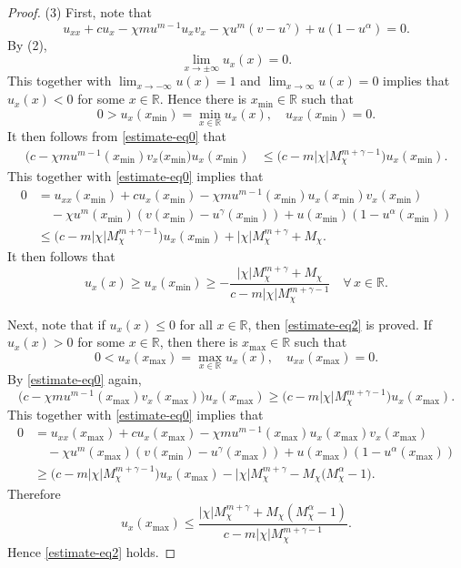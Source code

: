 \documentclass[11pt]{article} %
\theoremstyle{remark}
\theoremstyle{remark}
\numberwithin{equation}{section}
\numberwithin{figure}{section}
\numberwithin{table}{section}
\newcommand\RR{\ensuremath{\mathbb{R}}}
\begin{document}
\begin{proof}
(3) First, note that
$$
u_{xx}+cu_x-\chi m u^{m-1} u_x v_x-\chi u^m (v-u^\gamma)+u(1-u^\alpha)=0.
$$
By (2), 
$$
\lim_{x\to\pm\infty}u_x(x)=0.
$$
This together with $\lim_{x\to -\infty} u(x)=1$ and $\lim_{x\to\infty}u(x)=0$ implies that 
$u_x(x)<0$ for some $x\in\RR$. Hence 
 there is $x_{\min}\in\RR$ such that
$$
0>u_x(x_{\min})=\min_{x\in\RR} u_x(x),\quad u_{xx}(x_{\min})=0.
$$
It then follows from   \eqref{estimate-eq0}
that
\begin{align*}
\big(c -\chi m u^{m-1}(x_{\min}) v_x(x_{\min}\big)u_x(x_{\min}) &\le \Big (c- {m |\chi| M_\chi^{m+\gamma-1}} \Big) u_x(x_{\min}).
\end{align*}
This together with \eqref{estimate-eq0}  implies that
\begin{align*}
0&=u_{xx}(x_{\min})+cu_x(x_{\min})-\chi m u^{m-1}(x_{\min}) u_x (x_{\min})v_x(x_{\min})\\
&\quad -\chi u^m(x_{\min}) (v(x_{\min})-u^\gamma(x_{\min})) +u(x_{\min})(1-u^\alpha(x_{\min}))\\
&\le \big(c- m|\chi| M^{m+\gamma -1}_{\chi}\big)u_x(x_{\min})+ |\chi| M_{\chi}^{m+\gamma}+M_{\chi}.
\end{align*}
It then follows that
$$
u_x(x)\ge u_x(x_{\min})\ge -\frac{|\chi| M_{\chi}^{m+\gamma}+M_{\chi}}{c-m|\chi| M^{m+\gamma-1} _{\chi} }   \quad \forall\, x\in\RR.
$$

Next, note that if $u_x(x)\le 0$ for all $x\in\RR$, then \eqref{estimate-eq2} is proved. If $u_x(x)>0$ for some $x\in\RR$, then there is $x_{\max}\in\RR$ such that
$$
0<u_{x}(x_{\max})=\max_{x\in\RR} u_x(x),\quad u_{xx}(x_{\max})=0.
$$
By \eqref{estimate-eq0} again,
$$
\big(c-\chi m u^{m-1}(x_{\max}) v_x(x_{\max})\big)u_x(x_{\max})\ge \Big (c- m |\chi| M^{m+\gamma-1}_\chi \Big)u_x(x_{\max}).
$$
This together with \eqref{estimate-eq0}  implies that 
\begin{align*}
0&=u_{xx}(x_{\max})+cu_x(x_{\max})-\chi m u^{m-1}(x_{\max}) u_x (x_{\max})v_x(x_{\max})\\
&\quad -\chi u^m(x_{\max}) (v(x_{\min})-u^\gamma(x_{\max})) +u(x_{\max})(1-u^\alpha(x_{\max}))\\
&\ge (c- m |\chi| M^{m+\gamma-1}_\chi \Big) u_{x}(x_{\max})-|\chi| M_\chi^{m+\gamma}-M_\chi \big(M_{\chi}^{\alpha}-1\big).
\end{align*}
Therefore
$$
u_x(x_{\max})\le \frac{|\chi| M_\chi^{m+\gamma} +M_\chi(M_\chi^\alpha -1)}{c- m |\chi| M^{m+\gamma-1}_\chi }  .
$$
Hence \eqref{estimate-eq2} holds.



\end{proof}
\end{document}
